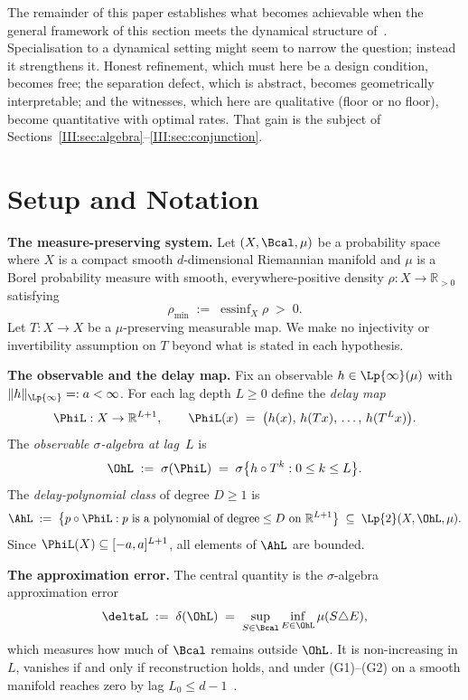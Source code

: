 The remainder of this paper establishes what becomes achievable when the
general framework of this section meets the dynamical structure of~\cite{mahon_paper2}.
Specialisation to a dynamical setting might seem to narrow the question;
instead it strengthens it.  Honest refinement, which must here be a design condition,
becomes free; the separation defect, which is abstract, becomes geometrically
interpretable; and the witnesses, which here are qualitative (floor or no
floor), become quantitative with optimal rates.  That gain is the subject of
Sections~\ref{III:sec:algebra}--\ref{III:sec:conjunction}.

\section{Setup and Notation}
\label{III:sec:setup}

\textbf{The measure-preserving system.}\enspace
Let $(X, \Bcal, \mu)$ be a probability space where $X$ is a compact smooth
$d$-dimensional Riemannian manifold and $\mu$ is a Borel probability measure
with smooth, everywhere-positive density $\rho : X \to \mathbb{R}_{>0}$
satisfying
\[
  \rho_{\min} \;:=\; \operatorname{essinf}_X \rho \;>\; 0.
\]
Let $T : X \to X$ be a $\mu$-preserving measurable map.
We make no injectivity or invertibility assumption on $T$ beyond what
is stated in each hypothesis.

\textbf{The observable and the delay map.}\enspace
Fix an observable $h \in \Lp{\infty}(\mu)$ with $\|h\|_{\Lp{\infty}} =: a < \infty$.
For each lag depth $L \geq 0$ define the \emph{delay map}
\[
  \PhiL : X \to \mathbb{R}^{L+1},
  \qquad
  \PhiL(x) \;=\; \bigl(h(x),\, h(Tx),\, \ldots,\, h(T^L x)\bigr).
\]
The \emph{observable $\sigma$-algebra at lag~$L$} is
\[
  \OhL \;:=\; \sigma(\PhiL) \;=\; \sigma\bigl\{h \circ T^k : 0 \leq k \leq L\bigr\}.
\]
The \emph{delay-polynomial class} of degree $D \geq 1$ is
\[
  \AhL \;:=\;
  \bigl\{p \circ \PhiL : p \text{ is a polynomial of degree} \leq D \text{ on }
  \mathbb{R}^{L+1}\bigr\} \;\subseteq\; \Lp{2}(X, \OhL, \mu).
\]
Since $\PhiL(X) \subseteq [-a,a]^{L+1}$, all elements of $\AhL$ are bounded.

\textbf{The approximation error.}\enspace
The central quantity is the $\sigma$-algebra approximation error
\begin{equation}
  \deltaL \;:=\; \delta(\OhL) \;=\;
  \sup_{S \in \Bcal} \inf_{E \in \OhL} \mu(S \triangle E),
  \label{III:eq:delta-def}
\end{equation}
which measures how much of $\Bcal$ remains outside $\OhL$.
It is non-increasing in $L$, vanishes if and only if reconstruction holds,
and under (G1)--(G2) on a smooth manifold reaches zero by lag $L_0 \leq d-1$~\cite{mahon_paper2}.

